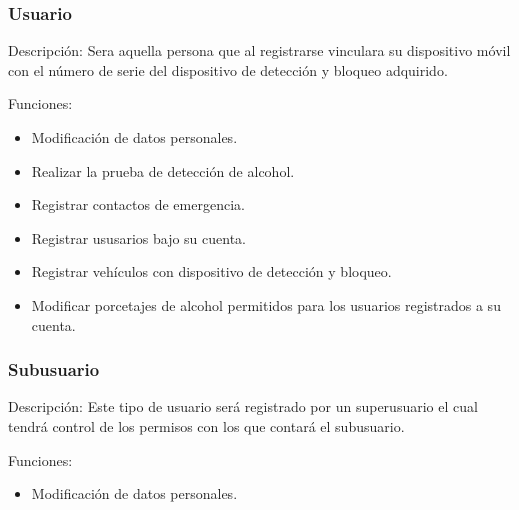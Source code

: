 	\subsubsection{Usuario}
	Descripción: Sera aquella persona que al registrarse vinculara su dispositivo móvil con el número de serie del dispositivo de detección y bloqueo adquirido. \par
	Funciones:
	\begin{itemize}
		\item Modificación de datos personales.
		\item Realizar la prueba de detección de alcohol.
		\item Registrar contactos de emergencia.
		\item Registrar ususarios bajo su cuenta.
		\item Registrar vehículos con dispositivo de detección y bloqueo.
		\item Modificar porcetajes de alcohol permitidos para los usuarios registrados a su cuenta.
	\end{itemize}
	\subsubsection{Subusuario}
	Descripción: Este tipo de usuario será registrado por un superusuario el cual tendrá control de los permisos con los que contará el subusuario. \par
	Funciones:
	\begin{itemize}
		\item Modificación de datos personales.
	\end{itemize}
	